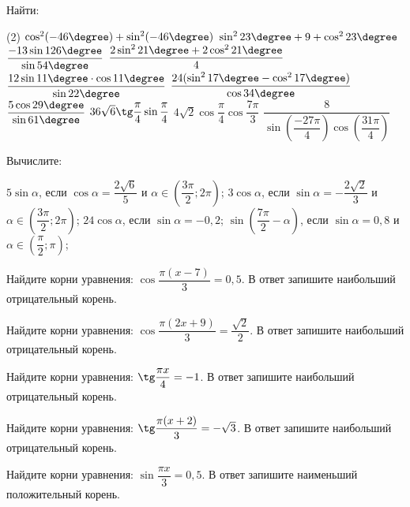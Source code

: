 \begin{class}[number=2]
	\begin{listofex}
		\item Найти:
		\begin{tasks}(2)
			\task \( \cos^2(-46\degree)+\sin^2(-46\degree) \)
			\task \( \sin^223\degree+9+\cos^223\degree \)
			\task \( \dfrac{-13\sin126\degree}{\sin54\degree} \)
			\task \( \dfrac{2\sin^221\degree+2\cos^221\degree}{4} \)
			\task \( \dfrac{ 12\sin 11 \degree \cdot \cos 11 \degree }{ \sin 22 \degree } \)
			\task \( \dfrac{ 24 (\sin^2 17 \degree-\cos^217 \degree) }{ \cos 34 \degree } \)
			\task \( \dfrac{ 5 \cos 29 \degree }{ \sin 61 \degree } \)
			\task \( 36 \sqrt{6} \tg \dfrac{ \pi }{ 4 } \sin \dfrac{ \pi }{ 4 } \)
			\task \( 4 \sqrt{2} \cos \dfrac{ \pi }{ 4 } \cos \dfrac{ 7\pi }{3  } \)
			\task \( \dfrac{ 8 }{ \sin \left( \dfrac{ -27\pi }{ 4 } \right) \cos \left( \dfrac{ 31\pi }{ 4 } \right) } \)
		\end{tasks}
		\item Вычислите:
		\begin{tasks}
			\task \( 5\sin\alpha \), если \( \cos\alpha=\dfrac{2\sqrt{6}}{5} \) и \( \alpha\in\left( \dfrac{3\pi}{2}; 2\pi \right) \);
			\task \( 3\cos\alpha \), если \( \sin\alpha=-\dfrac{2\sqrt{2}}{3} \) и \( \alpha\in\left( \dfrac{3\pi}{2}; 2\pi \right) \);
			\task \( 24\cos\alpha \), если \( \sin\alpha=-0,2 \);
			\task \( \sin\left( \dfrac{7\pi}{2}-\alpha \right) \), если \( \sin\alpha=0,8 \) и \( \alpha\in\left( \dfrac{\pi}{2}; \pi \right) \);
		\end{tasks}
		\item Найдите корни уравнения: \( \cos \dfrac{ \pi(x-7) }{ 3 } = 0,5 \).  В ответ запишите наибольший отрицательный корень.
		\item Найдите корни уравнения: \( \cos \dfrac{ \pi(2x+9) }{ 3 } = \dfrac{ \sqrt{2} }{ 2 } \).  В ответ запишите наибольший отрицательный корень.
		\item Найдите корни уравнения: \( \tg \dfrac{ \pi x }{ 4 } = -1 \).  В ответ запишите наибольший отрицательный корень.
		\item Найдите корни уравнения: \( \tg \dfrac{ \pi (x+2) }{ 3 } = -\sqrt{3} \).  В ответ запишите наибольший отрицательный корень.
		\item Найдите корни уравнения: \( \sin \dfrac{ \pi x }{ 3 } = 0,5 \).  В ответ запишите наименьший положительный корень.
	\end{listofex}
\end{class}


